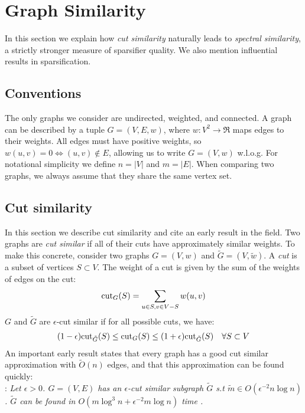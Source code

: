 \documentclass{article}
\begin{document}
\section{Graph Similarity}

In this section we explain how \textit{cut similarity} naturally leads to
\textit{spectral similarity}, a strictly stronger measure of sparsifier
quality. We also mention influential results in sparsification.

\subsection{Conventions}

The only graphs we consider are undirected, weighted, and connected. A graph
can be described by a tuple $G = (V, E, w)$, where $w : V^2 \rightarrow \Re$
maps edges to their weights. All edges must have positive weights, so $w(u,
v) = 0 \Leftrightarrow (u, v) \not\in E$, allowing us to write $G = (V, w)$
w.l.o.g. For notational simplicity we define $n = |V|$ and $m = |E|$. When
comparing two graphs, we always assume that they share the same vertex set.

\subsection{Cut similarity}

In this section we describe cut similarity and cite an early result in the
field. Two graphs are \textit{cut similar} if all of their cuts have
approximately similar weights. To make this concrete, consider two graphs $G
= (V, w)$ and $\tilde{G} = (V, \tilde{w})$. A \textit{cut} is a subset of
vertices $S \subset V$.  The weight of a cut is given by the sum of the
weights of edges on the cut:
\begin{align*}
    \text{cut}_{G}(S) = \sum_{u \in S, v \in V - S} w(u, v)
\end{align*}
$G$ and $\tilde{G}$ are $\epsilon$-cut similar if for all possible cuts, we
have:
\begin{align*}
    (1 - \epsilon)\text{cut}_{\tilde{G}}(S) \leq \text{cut}_{G}(S) \leq (1 +
    \epsilon)\text{cut}_{\tilde{G}}(S) \quad \forall{S \subset V}
\end{align*}
An important early result states that every graph has a good cut similar
approximation with $\tilde{O}(n)$ edges, and that this approximation can be
found quickly: \\

\noindent
{}: \textit{Let $\epsilon > 0$. $G =
(V, E)$ has an $\epsilon$-cut similar subgraph $\tilde{G}$ s.t $\tilde{m}
\in O(\epsilon^{-2}n\log n)$. $\tilde{G}$ can be found in $O(m\log^3n +
\epsilon^{-2}m\log n)$ time \cite{BenczurKarger}.} \\
\end{document}
